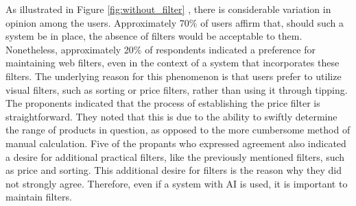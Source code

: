 \documentclass[../../submission.tex]{subfiles}
\begin{document}
 As illustrated in Figure \ref{fig:without_filter} , there is considerable variation in opinion among 
 the users. Approximately 70\% of users affirm that, should such a system be 
 in place, the absence of filters would be acceptable to them. Nonetheless, 
 approximately 20\% of respondents indicated a preference for maintaining web 
 filters, even in the context of a system that incorporates these filters. 
 The underlying reason for this phenomenon is that users prefer to utilize visual 
 filters, such as sorting or price filters, rather than using it through tipping. 
 The proponents indicated that the process of establishing the price filter is 
 straightforward. They noted that this is due to the ability to swiftly determine 
 the range of products in question, as opposed to the more cumbersome method of 
 manual calculation. Five of the propants who expressed agreement also indicated 
 a desire for additional practical filters, like the previously mentioned filters, 
 such as price and sorting. This additional desire for filters is the reason why 
 they did not strongly agree. Therefore, even if a system with AI is used, it is 
 important to maintain filters.
\end{document}
